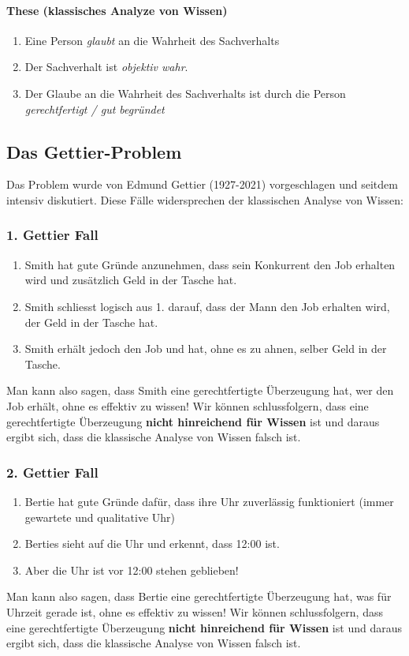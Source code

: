 \documentclass[../main.tex]{subfiles}
\begin{document}
\paragraph{These (klassisches Analyze von Wissen)}
\begin{enumerate}
	\item Eine Person \textit{glaubt} an die Wahrheit des Sachverhalts
	\item Der Sachverhalt ist \textit{objektiv wahr}.
	\item Der Glaube an die Wahrheit des Sachverhalts ist durch die Person \textit{gerechtfertigt / gut begründet}
\end{enumerate}

\subsection{Das Gettier-Problem}
Das Problem wurde von Edmund Gettier (1927-2021) vorgeschlagen und seitdem intensiv diskutiert. Diese Fälle widersprechen der klassischen Analyse von Wissen:
\subsubsection{1. Gettier Fall}
\begin{enumerate}
	\item Smith hat gute Gründe anzunehmen, dass sein Konkurrent den Job erhalten wird und zusätzlich Geld in der Tasche hat. 
	\item Smith schliesst logisch aus 1. darauf, dass der Mann den Job erhalten wird, der Geld in der Tasche hat. 
	\item Smith erhält jedoch den Job und hat, ohne es zu ahnen, selber Geld in der Tasche. 
\end{enumerate}

Man kann also sagen, dass Smith eine gerechtfertigte Überzeugung hat, wer den Job erhält, ohne es effektiv zu wissen! Wir können schlussfolgern, dass eine gerechtfertigte Überzeugung \textbf{nicht hinreichend für Wissen} ist und daraus ergibt sich, dass die klassische Analyse von Wissen falsch ist. 

\subsubsection{2. Gettier Fall}
\begin{enumerate}
	\item Bertie hat gute Gründe dafür, dass ihre Uhr zuverlässig funktioniert (immer gewartete und qualitative Uhr)
	\item Berties sieht auf die Uhr und erkennt, dass 12:00 ist.
	\item Aber die Uhr ist vor 12:00 stehen geblieben!
\end{enumerate}
Man kann also sagen, dass Bertie eine gerechtfertigte Überzeugung hat, was für Uhrzeit gerade ist, ohne es effektiv zu wissen! Wir können schlussfolgern, dass eine gerechtfertigte Überzeugung \textbf{nicht hinreichend für Wissen} ist und daraus ergibt sich, dass die klassische Analyse von Wissen falsch ist. 
\end{document}
